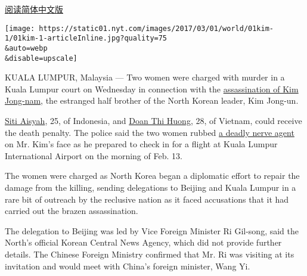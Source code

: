 \href{http://cn.nytimes.com/asia-pacific/20170301/north-korea-kim-jong-nam-death/dual/}{阅读简体中文版}

\texttt{[image: https://static01.nyt.com/images/2017/03/01/world/01kim-1/01kim-1-articleInline.jpg?quality=75\\\&auto=webp\\\&disable=upscale]}

KUALA LUMPUR, Malaysia --- Two women were charged with murder in a Kuala
Lumpur court on Wednesday in connection with the
\href{https://www.nytimes.com/2017/02/22/world/asia/kim-jong-nam-assassination-korea-malaysia.html?rref=collection\%2Fsectioncollection\%2Fasia\&action=click\&contentCollection=asia\&region=stream\&module=stream_unit\&version=latest\&contentPlacement=26\&pgtype=sectionfront}{assassination
of Kim Jong-nam}, the estranged half brother of the North Korean leader,
Kim Jong-un.

\href{https://www.nytimes.com/2017/02/25/world/asia/north-korea-kim-jong-nam-vx-nerve-agent-siti-aisyah.html?rref=collection\%2Fsectioncollection\%2Fasia\&action=click\&contentCollection=asia\&region=stream\&module=stream_unit\&version=latest\&contentPlacement=1\&pgtype=sectionfront}{Siti
Aisyah}, 25, of Indonesia, and
\href{https://www.nytimes.com/2017/02/24/world/asia/kim-jong-nam-suspect-doan-thi-huong.html?rref=collection\%2Fsectioncollection\%2Fasia\&action=click\&contentCollection=asia\&region=stream\&module=stream_unit\&version=latest\&contentPlacement=9\&pgtype=sectionfront}{Doan
Thi Huong}, 28, of Vietnam, could receive the death penalty. The police
said the two women rubbed
\href{https://www.nytimes.com/2017/02/24/world/asia/north-korea-kim-jong-nam-vx-nerve-agent.html?rref=collection\%2Fsectioncollection\%2Fasia\&action=click\&contentCollection=asia\&region=stream\&module=stream_unit\&version=latest\&contentPlacement=7\&pgtype=sectionfront}{a
deadly nerve agent} on Mr. Kim's face as he prepared to check in for a
flight at Kuala Lumpur International Airport on the morning of Feb. 13.

The women were charged as North Korea began a diplomatic effort to
repair the damage from the killing, sending delegations to Beijing and
Kuala Lumpur in a rare bit of outreach by the reclusive nation as it
faced accusations that it had carried out the brazen assassination.

The delegation to Beijing was led by Vice Foreign Minister Ri Gil-song,
said the North's official Korean Central News Agency, which did not
provide further details. The Chinese Foreign Ministry confirmed that Mr.
Ri was visiting at its invitation and would meet with China's foreign
minister, Wang Yi.

